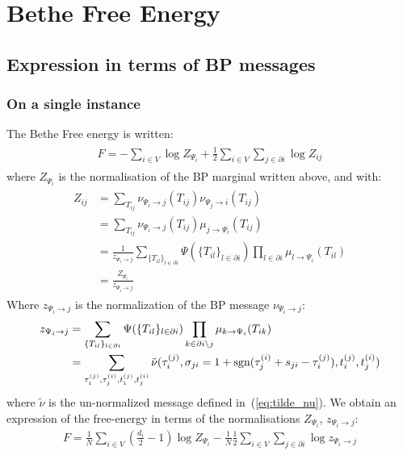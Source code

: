 \documentclass[a4paper, amsfonts, amssymb, amsmath, reprint, showkeys, nofootinbib, twoside, floatfix, pre,superscriptaddress, onecolumn]{revtex4-2}
\begin{document}
\section{Bethe Free Energy}
\subsection{Expression in terms of BP messages}
\subsubsection{On a single instance}
The Bethe Free energy is written:
\begin{align}
\begin{aligned}
	F = -\sum_{i\in V}\log Z_{\Psi_i} + \frac{1}{2}\sum_{i\in V}\sum_{j\in\partial i}\log Z_{ij}
\end{aligned}
\end{align}
where $Z_{\Psi_i}$ is the normalisation of the BP marginal written above, and with:
\begin{align}
\begin{aligned}
	Z_{ij} &= \sum_{T_{ij}}\nu_{\Psi_i\to j}(T_{ij})\nu_{\Psi_j\to i}(T_{ij}) \\
	&= \sum_{T_{ij}}\nu_{\Psi_i\to j}(T_{ij})\mu_{j\to \Psi_i}(T_{ij}) \\
	&= \frac{1}{z_{\Psi_i\to j}}\sum_{\{T_{il}\}_{l\in\partial i}}\Psi(\{T_{il}\}_{l\in\partial i})\prod_{l\in\partial i}\mu_{l\to \Psi_i}(T_{il}) \\
	&= \frac{Z_{\Psi_i}}{z_{\Psi_i\to j}}
\end{aligned}
\end{align}
Where $z_{\Psi_i\to j}$ is the normalization of the BP message $\nu_{\Psi_i\to j}$:
\begin{align}
\begin{aligned}
	z_{\Psi_i\to j} &= \sum_{\{T_{il}\}_{l\in\partial i}}\Psi(\{T_{il}\}_{l\in\partial i})\prod_{k\in\partial i\setminus j}\mu_{k\to \Psi_i}(T_{ik}) \\
	&= \sum_{\tau_i^{(j)},\tau_j^{(i)},t_i^{(j)},t_j^{(i)}}\tilde{\nu}(\tau_i^{(j)},\sigma_{ji}=1+{\rm sgn}(\tau_j^{(i)}+s_{ji}-\tau_i^{(j)}), t_i^{(j)},t_j^{(i)})
\end{aligned}
\end{align}
where $\tilde{\nu}$ is the un-normalized message defined in~(\ref{eq:tilde_nu}).
We obtain an expression of the free-energy in terms of the normalisations $Z_{\Psi_i}$, $z_{\Psi_i\to j}$:
\begin{align}
	F = \frac{1}{N}\sum_{i\in V}\left(\frac{d_i}{2}-1\right)\log Z_{\Psi_i} - \frac{1}{N}\frac{1}{2}\sum_{i\in V}\sum_{j\in\partial i}\log z_{\Psi_i\to j}
\end{align}
\end{document}

